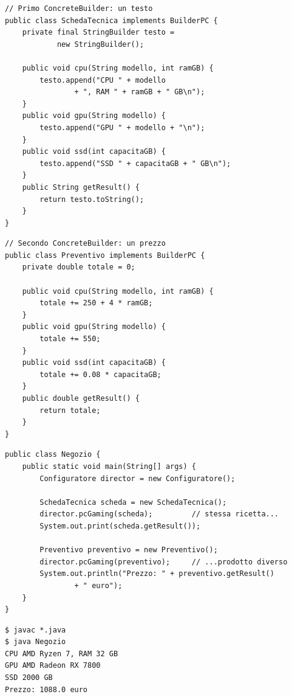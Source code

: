\noindent\begin{minipage}[t]{0.49\textwidth}
\begin{lstlisting}[style=java, name=SchedaTecnica.java]
// Primo ConcreteBuilder: un testo
public class SchedaTecnica implements BuilderPC {
    private final StringBuilder testo =
            new StringBuilder();

    public void cpu(String modello, int ramGB) {
        testo.append("CPU " + modello
                + ", RAM " + ramGB + " GB\n");
    }
    public void gpu(String modello) {
        testo.append("GPU " + modello + "\n");
    }
    public void ssd(int capacitaGB) {
        testo.append("SSD " + capacitaGB + " GB\n");
    }
    public String getResult() {
        return testo.toString();
    }
}
\end{lstlisting}
\end{minipage}\hfill
\begin{minipage}[t]{0.49\textwidth}
\begin{lstlisting}[style=java, name=Preventivo.java]
// Secondo ConcreteBuilder: un prezzo
public class Preventivo implements BuilderPC {
    private double totale = 0;

    public void cpu(String modello, int ramGB) {
        totale += 250 + 4 * ramGB;
    }
    public void gpu(String modello) {
        totale += 550;
    }
    public void ssd(int capacitaGB) {
        totale += 0.08 * capacitaGB;
    }
    public double getResult() {
        return totale;
    }
}
\end{lstlisting}
\end{minipage}

\noindent\begin{minipage}[t]{0.62\textwidth}
\begin{lstlisting}[style=java, name=Negozio.java]
public class Negozio {
    public static void main(String[] args) {
        Configuratore director = new Configuratore();

        SchedaTecnica scheda = new SchedaTecnica();
        director.pcGaming(scheda);         // stessa ricetta...
        System.out.print(scheda.getResult());

        Preventivo preventivo = new Preventivo();
        director.pcGaming(preventivo);     // ...prodotto diverso
        System.out.println("Prezzo: " + preventivo.getResult()
                + " euro");
    }
}
\end{lstlisting}
\end{minipage}\hfill
\begin{minipage}[t]{0.35\textwidth}
\begin{lstlisting}[style=shell, name=Terminale]
$ javac *.java
$ java Negozio
CPU AMD Ryzen 7, RAM 32 GB
GPU AMD Radeon RX 7800
SSD 2000 GB
Prezzo: 1088.0 euro
\end{lstlisting}
\end{minipage}

